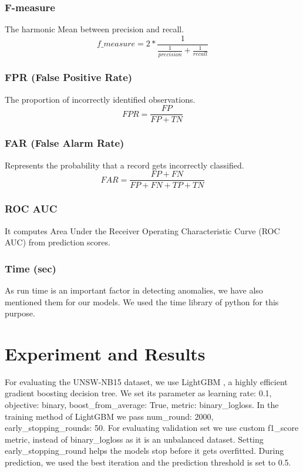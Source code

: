 \documentclass[14pt, conference]{IEEEtran}
\begin{document}
\subsubsection{F-measure}
The harmonic Mean between precision and recall.
\begin{equation}
    f\_measure = 2 * \frac{1}{\frac{1}{precision}+ \frac{1}{recall}}
\end{equation}

\subsubsection{FPR (False Positive Rate)}
The proportion of incorrectly identified observations.
\begin{equation}
    FPR = \frac{FP}{FP+TN}
\end{equation}

\subsubsection{FAR (False Alarm Rate)}
Represents the probability that a record gets incorrectly classified.
\begin{equation}
    FAR = \frac{FP+FN}{FP+FN+TP+TN}
\end{equation}

\subsubsection{ROC AUC}
It computes Area Under the Receiver Operating Characteristic Curve (ROC AUC) from prediction scores.

\subsubsection{Time (sec)}
As run time is an important factor in detecting anomalies, we have also mentioned them for our models. We used the time library of python for this purpose.




\section{Experiment and Results \label{results}}
For evaluating the UNSW-NB15 dataset, we use LightGBM \cite{ke2017lightgbm}, a highly efficient gradient boosting decision tree. We set its parameter as learning rate: 0.1, objective: binary, boost\_from\_average: True, metric: binary\_logloss. In the training method of LightGBM we pass num\_round: 2000, early\_stopping\_rounds: 50. For evaluating validation set we use custom f1\_score metric, instead of binary\_logloss as it is an unbalanced dataset. Setting early\_stopping\_round helps the models stop before it gets overfitted. During prediction, we used the best iteration and the prediction threshold is set to 0.5.
\end{document}
